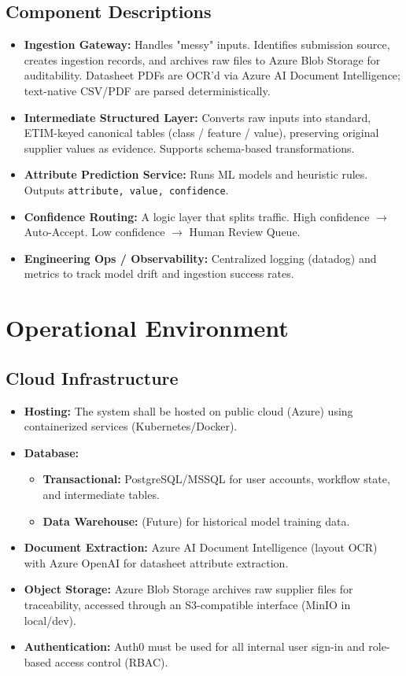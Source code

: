 \documentclass[12pt, a4paper]{article}
\begin{document}
\subsection{Component Descriptions}
\begin{itemize}
    \item \textbf{Ingestion Gateway:} Handles "messy" inputs. Identifies submission source, creates ingestion records, and archives raw files to Azure Blob Storage for auditability. Datasheet PDFs are OCR'd via Azure AI Document Intelligence; text-native CSV/PDF are parsed deterministically.
    \item \textbf{Intermediate Structured Layer:} Converts raw inputs into standard, ETIM-keyed canonical tables (class / feature / value), preserving original supplier values as evidence. Supports schema-based transformations.
    \item \textbf{Attribute Prediction Service:} Runs ML models and heuristic rules. Outputs \texttt{{attribute, value, confidence}}.
    \item \textbf{Confidence Routing:} A logic layer that splits traffic. High confidence $\rightarrow$ Auto-Accept. Low confidence $\rightarrow$ Human Review Queue.
    \item \textbf{Engineering Ops / Observability:} Centralized logging (datadog) and metrics to track model drift and ingestion success rates.
\end{itemize}

\newpage
\section{Operational Environment}

\subsection{Cloud Infrastructure}
\begin{itemize}
    \item \textbf{Hosting:} The system shall be hosted on public cloud (Azure) using containerized services (Kubernetes/Docker).
    \item \textbf{Database:} 
    \begin{itemize}
        \item \textbf{Transactional:} PostgreSQL/MSSQL for user accounts, workflow state, and intermediate tables.
        \item \textbf{Data Warehouse:} (Future) for historical model training data.
    \end{itemize}
    \item \textbf{Document Extraction:} Azure AI Document Intelligence (layout OCR) with Azure OpenAI for datasheet attribute extraction.
    \item \textbf{Object Storage:} Azure Blob Storage archives raw supplier files for traceability, accessed through an S3-compatible interface (MinIO in local/dev).
    \item \textbf{Authentication:} Auth0 must be used for all internal user sign-in and role-based access control (RBAC).
\end{itemize}
\end{document}
